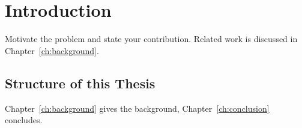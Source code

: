 \chapter{Introduction}
\label{ch:introduction}

Motivate the problem and state your contribution.
Related work is discussed in Chapter~\ref{ch:background}.

\section{Structure of this Thesis}
Chapter~\ref{ch:background} gives the background,
Chapter~\ref{ch:conclusion} concludes.
